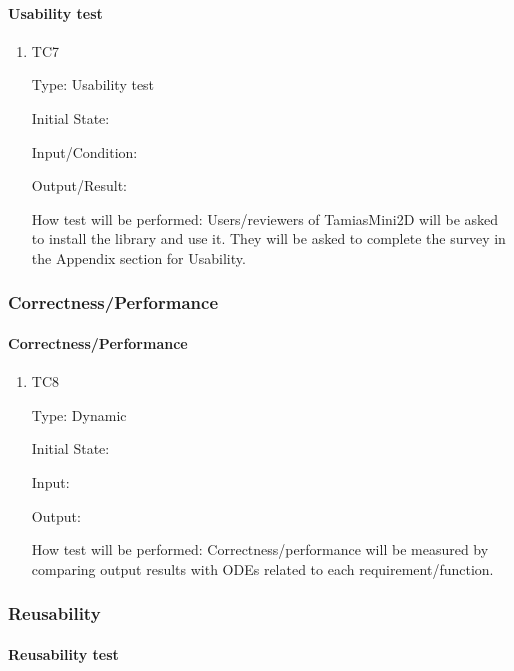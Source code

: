 \documentclass[12pt, titlepage]{article}
\begin{document}
\paragraph{Usability test}

\begin{enumerate}

\item{TC7\\}

Type: Usability test
					
Initial State: 
					
Input/Condition: 
					
Output/Result: 
					
How test will be performed: Users/reviewers of TamiasMini2D will be asked to install the library and use it. They will be asked to complete the survey in the Appendix section for Usability. 
					
\end{enumerate}


\subsubsection{Correctness/Performance}

\paragraph{Correctness/Performance}

\begin{enumerate}

\item{TC8\\}

Type: Dynamic

Initial State: 

Input: 

Output: 

How test will be performed: Correctness/performance will be measured by comparing output results with ODEs related to each requirement/function.
\end{enumerate}

\subsubsection{Reusability}

\paragraph{Reusability test}
\end{document}
